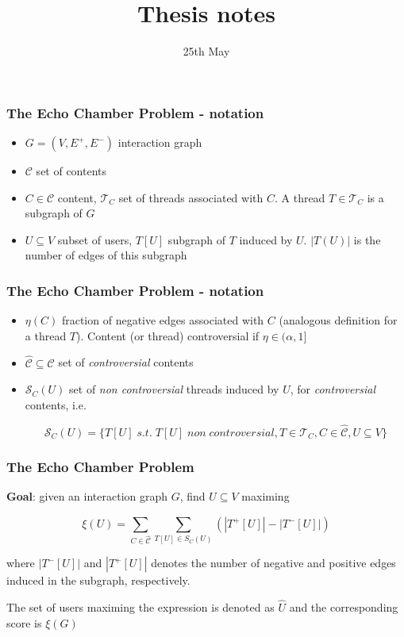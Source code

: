 \documentclass{beamer}
\title{Thesis notes}
\date{25th May}
\begin{document}
\frame{\titlepage}

\begin{frame}[c]
	\frametitle{The Echo Chamber Problem - notation}

	\begin{itemize}
		\item $G = (V, E ^{+}, E ^{-}) $ interaction graph
		\item $ \mathcal{C} $ set of contents
		\item $C \in \mathcal{C} $ content, $\mathcal{T} _{C} $ set of threads
		      associated with $C$. A thread $T \in \mathcal{T} _{C} $ is a
		      subgraph of $G$
		\item $U \subseteq V$ subset of users, $T[U]$ subgraph of $T$ induced
		      by $U$. $|T(U)|$ is the number of edges of this subgraph
	\end{itemize}
\end{frame}

\begin{frame}[c]
	\frametitle{The Echo Chamber Problem - notation}
	\begin{itemize}
		\item $\eta(C)$ fraction of negative edges associated with $C$
		      (analogous definition for a thread $T$). Content (or thread)
		      controversial if $\eta \in (\alpha, 1]$
		\item $\hat{\mathcal{C} } \subseteq \mathcal{C} $ set of \textit{controversial}
		      contents

		\item $\mathcal{S} _C (U)$ set of \textit{non controversial} threads
		      induced by $U$, for \textit{controversial} contents, i.e.

			      {\small
				      \begin{equation}
					      \mathcal{S} _{C} (U) = \{ T[U] \; s.t. \; T[U] \; non \;
					      controversial, T \in \mathcal{T} _{C}, C
					      \in \hat{\mathcal{C}}, U \subseteq V\}
				      \end{equation}
			      }
	\end{itemize}

\end{frame}

\begin{frame}[c]
	\frametitle{The Echo Chamber Problem}
	\textbf{Goal}: given an interaction graph $G$, find $U \subseteq V$ maximing

	\begin{equation}
		\xi (U) = \sum^{}_{C \in \hat{\mathcal{C}} } \sum^{}_{T[U] \in S_C (U)}
		(| T^{+} [U] | - | T^{-} [U] |)
	\end{equation}

	where $| T^{-} [U] |$ and $| T^{+} [U] |$ denotes the number of negative
	and positive edges induced in the subgraph, respectively.

	\bigskip

	The set of users maximing the expression is denoted as $\hat{U}$ and the
	corresponding score is $\xi(G)$
\end{frame}
\end{document}
